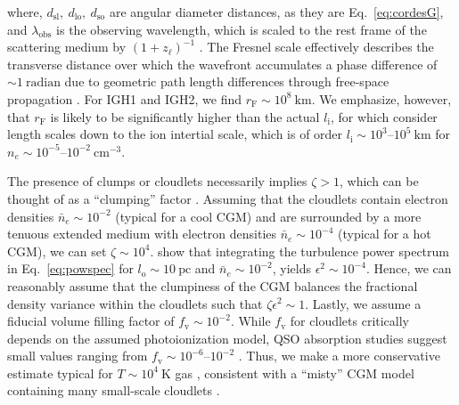 \documentclass[twocolumn, linenumbers, tra]{aastex631}
\newcommand{\rev}[1]{{\color{purple}#1}}
\begin{document}
\noindent
\rev{where, $d_{\mathrm{sl}},\ d_{\mathrm{lo}},\ d_{\mathrm{so}}$ are angular diameter distances, as they are Eq.~\ref{eq:cordesG}, and $\lambda_{\mathrm{obs}}$ is the observing wavelength, which is scaled to the rest frame of the scattering medium by $(1+z_{\ell})^{-1}$ \citep{Macquart2013}. The Fresnel scale effectively describes the transverse distance over which the wavefront accumulates a phase difference of $ \sim 1\ \mathrm{radian}$ due to geometric path length differences through free-space propagation \citep{Rickett2009}. For IGH1 and IGH2, we find $r_{\mathrm{F}} \sim 10^{8}\ \mathrm{km}$. We emphasize, however, that $r_{\mathrm{F}}$ is likely to be significantly higher than the actual $l_\mathrm{i}$, for which \citet{Ocker2025} consider length scales down to the ion intertial scale, which is of order $l_\mathrm{i} \sim  10^{3}$--$10^{5}\ \mathrm{km}$ for $n_e \sim  10^{-5}$--$10^{-2}\ \mathrm{cm}^{-3}$.

The presence of clumps or cloudlets necessarily implies $\zeta > 1$, which can be thought of as a ``clumping'' factor \citep{Ocker2025}. Assuming that the cloudlets contain electron densities $\bar{n}_e \sim 10^{-2}$ (typical for a cool CGM) and are surrounded by a more tenuous extended medium with electron densities $\bar{n}_e \sim 10^{-4}$ (typical for a hot CGM), we can set $\zeta \sim 10^4$. \citet{Ocker2025} show that integrating the turbulence power spectrum in Eq.~\ref{eq:powspec} for $l_\mathrm{o} \sim 10\ \mathrm{pc}$ and $\bar{n}_e \sim 10^{-2}$, yields $\epsilon^2 \sim 10^{-4}$. Hence, we can reasonably assume that the clumpiness of the CGM balances the fractional density variance within the cloudlets such that $\zeta\epsilon^2 \sim 1$. Lastly, we assume a fiducial volume filling factor of $f_{\mathrm{v}} \sim 10^{-2}$. While $f_{\mathrm{v}}$ for cloudlets critically depends on the assumed photoionization model, QSO absorption studies suggest small values ranging from $f_{\mathrm{v}} \sim 10^{-6}$--$10^{-2}$ \citep{Crighton2013, Prochaska2008, Lau2016}. Thus, we make a more conservative estimate typical for $T \sim 10^{4}\ \mathrm{K}$ gas \citep{Werk2014}, consistent with a ``misty'' CGM model containing many small-scale cloudlets \citep{McCourt2018}. 


}
\end{document}
